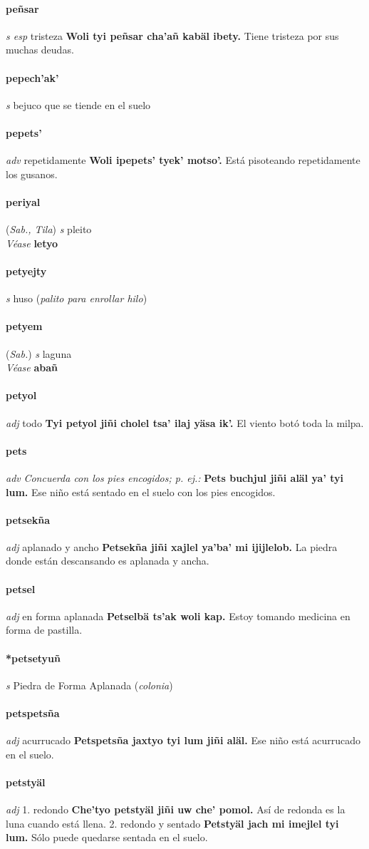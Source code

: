 \documentclass{scrbook}
\newcommand{\entry}[1]{\paragraph{#1}}
\newcommand{\onedefinition}[1]{#1.}
\newcommand{\nontranslationdef}[1]{\textit{#1}}
\newcommand{\partofspeech}[1]{\textit{#1}}
\newcommand{\spanishtranslation}[1]{#1}
\newcommand{\clarification}[1]{(\textit{#1})}
\newcommand{\cholexample}[1]{\textbf{#1}}
\newcommand{\exampletranslation}[1]{#1}
\newcommand{\alsosee}[1]{\\\textit{Véase} \textbf{#1}}
\newcommand{\relevantdialect}[1]{(\textit{#1})}
\begin{document}
\begin{multicols}{2}
\entry{peñsar}
\partofspeech{s esp}
\spanishtranslation{tristeza}
\cholexample{Woli tyi peñsar cha'añ kabäl ibety.}
\exampletranslation{Tiene tristeza por sus muchas deudas.}

\entry{pepech'ak'}
\partofspeech{s}
\spanishtranslation{bejuco que se tiende en el suelo}

\entry{pepets'}
\partofspeech{adv}
\spanishtranslation{repetidamente}
\cholexample{Woli ipepets' tyek' motso'.}
\exampletranslation{Está pisoteando repetidamente los gusanos.}

\entry{periyal}
\relevantdialect{Sab., Tila}
\partofspeech{s}
\spanishtranslation{pleito}
\alsosee{letyo}

\entry{petyejty}
\partofspeech{s}
\spanishtranslation{huso}
\clarification{palito para enrollar hilo}

\entry{petyem}
\relevantdialect{Sab.}
\partofspeech{s}
\spanishtranslation{laguna}
\alsosee{abañ}

\entry{petyol}
\partofspeech{adj}
\spanishtranslation{todo}
\cholexample{Tyi petyol jiñi cholel tsa' ilaj yäsa ik'.}
\exampletranslation{El viento botó toda la milpa.}

\entry{pets}
\partofspeech{adv}
\nontranslationdef{Concuerda con los pies encogidos; p. ej.:}
\cholexample{Pets buchjul jiñi aläl ya' tyi lum.}
\exampletranslation{Ese niño está sentado en el suelo con los pies encogidos.}

\entry{petsekña}
\partofspeech{adj}
\spanishtranslation{aplanado y ancho}
\cholexample{Petsekña jiñi xajlel ya'ba' mi ijijlelob.}
\exampletranslation{La piedra donde están descansando es aplanada y ancha.}

\entry{petsel}
\partofspeech{adj}
\spanishtranslation{en forma aplanada}
\cholexample{Petselbä ts'ak woli kap.}
\exampletranslation{Estoy tomando medicina en forma de pastilla.}

\entry{*petsetyuñ}
\partofspeech{s}
\spanishtranslation{Piedra de Forma Aplanada}
\clarification{colonia}

\entry{petspetsña}
\partofspeech{adj}
\spanishtranslation{acurrucado}
\cholexample{Petspetsña jaxtyo tyi lum jiñi aläl.}
\exampletranslation{Ese niño está acurrucado en el suelo.}

\entry{petstyäl}
\partofspeech{adj}
\onedefinition{1}
\spanishtranslation{redondo}
\cholexample{Che'tyo petstyäl jiñi uw che' pomol.}
\exampletranslation{Así de redonda es la luna cuando está llena.}
\onedefinition{2}
\spanishtranslation{redondo y sentado}
\cholexample{Petstyäl jach mi imejlel tyi lum.}
\exampletranslation{Sólo puede quedarse sentada en el suelo.}


\end{multicols}
\end{document}
